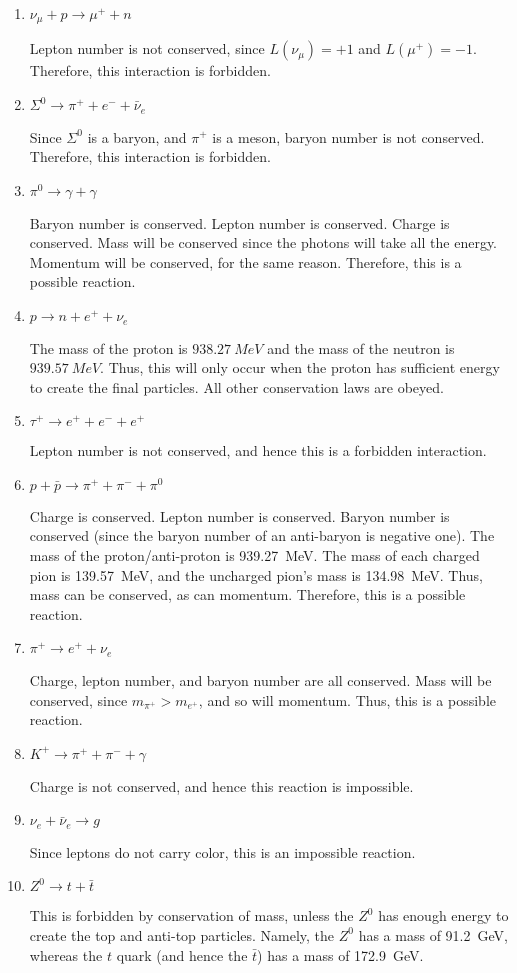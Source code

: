 \begin{enumerate}
	\item $\nu_\mu + p \to \mu^+ + n$
	
	Lepton number is not conserved, since $L(\nu_\mu) = +1$ and $L(\mu^+) = -1$. Therefore, this interaction is forbidden.
	\item $\Sigma^0 \to \pi^+ + e^- + \bar{\nu}_e$
	
	Since $\Sigma^0$ is a baryon, and $\pi^+$ is a meson, baryon number is not conserved. Therefore, this interaction is forbidden.
	\item $\pi^0\to \gamma + \gamma$
	
	Baryon number is conserved. Lepton number is conserved. Charge is conserved. Mass will be conserved since the photons will take all the energy. Momentum will be conserved, for the same reason. Therefore, this is a possible reaction.
	\item $p\to n + e^+ + \nu_e$
	
	The mass of the proton is $\SI{938.27}{MeV}$ and the mass of the neutron is $\SI{939.57}{MeV}$. Thus, this will only occur when the proton has sufficient energy to create the final particles. All other conservation laws are obeyed.
	\item $\tau^+ \to e^+ + e^- + e^+$
	
	Lepton number is not conserved, and hence this is a forbidden interaction.
	\item $p + \bar{p} \to \pi^+ + \pi^- + \pi^0$
	
	Charge is conserved. Lepton number is conserved. Baryon number is conserved (since the baryon number of an anti-baryon is negative one). The mass of the proton/anti-proton is \SI{939.27}{MeV}. The mass of each charged pion is \SI{139.57}{MeV}, and the uncharged pion's mass is \SI{134.98}{MeV}. Thus, mass can be conserved, as can momentum. Therefore, this is a possible reaction.
	\item $\pi^+ \to e^+ + \nu_e$
	
	Charge, lepton number, and baryon number are all conserved. Mass will be conserved, since $m_{\pi^+} > m_{e^+}$, and so will momentum. Thus, this is a possible reaction. 
	\item $K^+ \to \pi^+ + \pi^- + \gamma$
	
	Charge is not conserved, and hence this reaction is impossible. 
	\item $\nu_e + \bar{\nu}_e \to g$
	
	Since leptons do not carry color, this is an impossible reaction.
	\item $Z^0 \to t + \bar{t}$
	
	This is forbidden by conservation of mass, unless the $Z^0$ has enough energy to create the top and anti-top particles. Namely, the $Z^0$ has a mass of \SI{91.2}{GeV}, whereas the $t$ quark (and hence the $\bar{t}$) has a mass of \SI{172.9}{GeV}. 
\end{enumerate}
